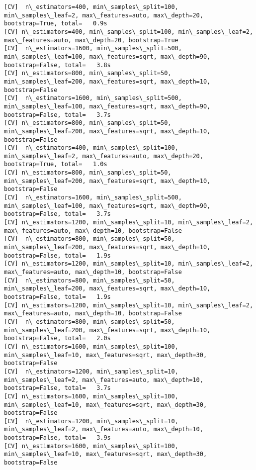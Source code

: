 \documentclass[11pt]{article}
\begin{document}
\begin{Verbatim}[commandchars=\\\{\}]
[CV]  n\_estimators=400, min\_samples\_split=100, min\_samples\_leaf=2, max\_features=auto, max\_depth=20, bootstrap=True, total=   0.9s
[CV] n\_estimators=400, min\_samples\_split=100, min\_samples\_leaf=2, max\_features=auto, max\_depth=20, bootstrap=True 
[CV]  n\_estimators=1600, min\_samples\_split=500, min\_samples\_leaf=100, max\_features=sqrt, max\_depth=90, bootstrap=False, total=   3.8s
[CV] n\_estimators=800, min\_samples\_split=50, min\_samples\_leaf=200, max\_features=sqrt, max\_depth=10, bootstrap=False 
[CV]  n\_estimators=1600, min\_samples\_split=500, min\_samples\_leaf=100, max\_features=sqrt, max\_depth=90, bootstrap=False, total=   3.7s
[CV] n\_estimators=800, min\_samples\_split=50, min\_samples\_leaf=200, max\_features=sqrt, max\_depth=10, bootstrap=False 
[CV]  n\_estimators=400, min\_samples\_split=100, min\_samples\_leaf=2, max\_features=auto, max\_depth=20, bootstrap=True, total=   1.0s
[CV] n\_estimators=800, min\_samples\_split=50, min\_samples\_leaf=200, max\_features=sqrt, max\_depth=10, bootstrap=False 
[CV]  n\_estimators=1600, min\_samples\_split=500, min\_samples\_leaf=100, max\_features=sqrt, max\_depth=90, bootstrap=False, total=   3.7s
[CV] n\_estimators=1200, min\_samples\_split=10, min\_samples\_leaf=2, max\_features=auto, max\_depth=10, bootstrap=False 
[CV]  n\_estimators=800, min\_samples\_split=50, min\_samples\_leaf=200, max\_features=sqrt, max\_depth=10, bootstrap=False, total=   1.9s
[CV] n\_estimators=1200, min\_samples\_split=10, min\_samples\_leaf=2, max\_features=auto, max\_depth=10, bootstrap=False 
[CV]  n\_estimators=800, min\_samples\_split=50, min\_samples\_leaf=200, max\_features=sqrt, max\_depth=10, bootstrap=False, total=   1.9s
[CV] n\_estimators=1200, min\_samples\_split=10, min\_samples\_leaf=2, max\_features=auto, max\_depth=10, bootstrap=False 
[CV]  n\_estimators=800, min\_samples\_split=50, min\_samples\_leaf=200, max\_features=sqrt, max\_depth=10, bootstrap=False, total=   2.0s
[CV] n\_estimators=1600, min\_samples\_split=100, min\_samples\_leaf=10, max\_features=sqrt, max\_depth=30, bootstrap=False 
[CV]  n\_estimators=1200, min\_samples\_split=10, min\_samples\_leaf=2, max\_features=auto, max\_depth=10, bootstrap=False, total=   3.7s
[CV] n\_estimators=1600, min\_samples\_split=100, min\_samples\_leaf=10, max\_features=sqrt, max\_depth=30, bootstrap=False 
[CV]  n\_estimators=1200, min\_samples\_split=10, min\_samples\_leaf=2, max\_features=auto, max\_depth=10, bootstrap=False, total=   3.9s
[CV] n\_estimators=1600, min\_samples\_split=100, min\_samples\_leaf=10, max\_features=sqrt, max\_depth=30, bootstrap=False 

\end{Verbatim}
\end{document}
